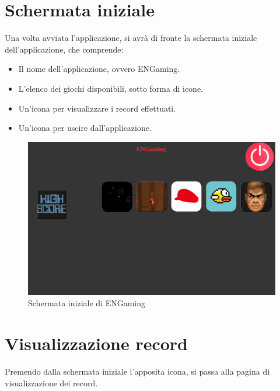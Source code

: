 \section{Schermata iniziale}
Una volta avviata l'applicazione, si avrà di fronte la schermata iniziale dell'applicazione, che comprende:
\begin{itemize}
    \item Il nome dell'applicazione, ovvero ENGaming.
    \item L'elenco dei giochi disponibili, sotto forma di icone.
    \item Un'icona per visualizzare i record effettuati.
    \item Un'icona per uscire dall'applicazione.
\end{itemize}
\begin{figure}[h]
    \centering
    \includegraphics[width=340pt]{schermataIniziale.png}
    \caption{Schermata iniziale di ENGaming}
    \label{fig:schermataIniziale}
\end{figure}
\newpage
\section{Visualizzazione record}
Premendo dalla schermata iniziale l'apposita icona, si passa alla pagina di visualizzazione dei record.
